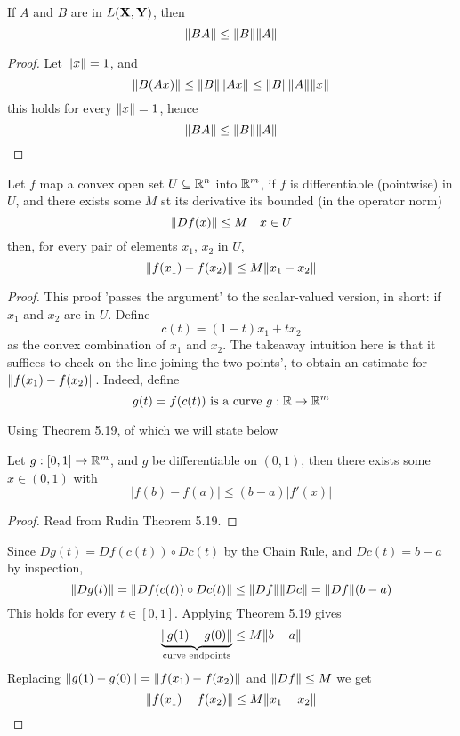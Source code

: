 \documentclass[../main-manifolds.tex]{subfiles}
\begin{document}
\begin{wts}\label{rudin-chp9-theorem-9.7}
    If $A$ and $B$ are in $L({\mathbf{X}},{\mathbf{Y}})$, then 
    \[
        \norm{BA}\leq\norm{B}\norm{A}
    \]
\end{wts}
\begin{proof}
    Let $\norm{x}=1$, and 
    \[
        \norm{B(Ax)}\leq\norm{B}\norm{Ax}\leq\norm{B}\norm{A}\norm{x}
    \]
    this holds for every $\norm{x}=1$, hence
    \[
        \norm{BA}\leq\norm{B}\norm{A}
    \]
\end{proof}
\begin{wts}\label{rudin-chp9-theorem-9.19}
    Let $f$ map a convex open set $U\subseteq{\mathbb{R}^n}$ into ${\mathbb{R}^m}$, if $f$ is differentiable (pointwise) in $U$, and there exists some $M$ st its derivative its bounded (in the operator norm)
    \[
        \norm{Df(x)}\leq M\quad x\in U
    \]
    then, for every pair of elements $x_1$, $x_2$ in $U$,
    \[
        \norm{f(x_1)-f(x_2)}\leq M\norm{x_1-x_2}
    \]
\end{wts}
\begin{proof}
    This proof 'passes the argument' to the scalar-valued version, in short: if $x_1$ and $x_2$ are in $U$. Define
    \[
        c(t) = (1-t)x_1 + tx_2
    \]
    as the convex combination of $x_1$ and $x_2$. The takeaway intuition here is that it suffices to check on the line joining the two points', to obtain an estimate for $\norm{f(x_1)-f(x_2)}$. Indeed, define
    \[
        g(t) = f(c(t))\text{ is a curve } g:\mathbb{R}\to{\mathbb{R}^m}
    \]
    
    Using Theorem 5.19, of which we will state below
    \begin{wts}
        Let $g: [0,1]\to{\mathbb{R}^m}$, and $g$ be differentiable on $(0,1)$, then there exists some $x\in (0,1)$ with
        \[
            |f(b)-f(a)|\leq (b-a)|f'(x)|
        \]
    \end{wts}
    \begin{proof}
        Read from Rudin Theorem 5.19.
    \end{proof}

    Since $Dg(t) = Df(c(t))\circ Dc(t)$ by the Chain Rule, and $Dc(t) = b-a$ by inspection,
    \[
        \norm{Dg(t)} = \norm{Df(c(t))\circ Dc(t)}\leq \norm{Df}\norm{Dc} = \norm{Df}(b-a)
    \]
    This holds for every $t\in [0,1]$. Applying Theorem 5.19 gives
    \[
        \underbrace{\norm{g(1)-g(0)}}_{\text{curve endpoints}}\leq M\norm{b-a}
    \]
    Replacing $\norm{g(1)-g(0)} = \norm{f(x_1) - f(x_2)}$ and $\norm{Df}\leq M$ we get
    \[
        \norm{f(x_1) - f(x_2)}\leq M \norm{x_1 - x_2}
    \]
\end{proof}
\end{document}
